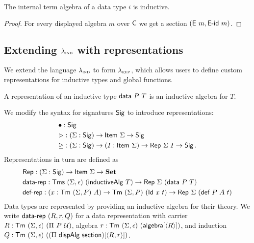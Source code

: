 \begin{lemma}
	The internal term algebra of a data type $i$ is inductive.
	\begin{proof}
		For every displayed algebra $m$ over $\textsf{C}$ we get a section $(\textsf{E}\ m, \textsf{E-id}\ m)$.
	\end{proof}
\end{lemma}


\subsection{Extending $\lambda_{\textsc{ind}}$ with representations}

We extend the language $\lambda_{\textsc{ind}}$ to form $\lambda_{\textsc{rep}}$, which allows users to
define custom representations for inductive types and global functions.

\begin{definition}
	A representation of an inductive type $\textsf{data}\ P\ T$ is an inductive algebra for $T$.
\end{definition}

We modify the syntax for signatures $\textsf{Sig}$ to introduce representations:
\begin{align*}
	 & \bullet : \Sig \\
	 & \rhd : (\Sigma : \Sig) \to \Item\ \Sigma \to \Sig \\
	 & \unrhd : (\Sigma : \Sig) \to (I : \Item\ \Sigma) \to \Rep\ \Sigma\ I \to \Sig \,.
\end{align*}
Representations in turn are defined as
\begin{align*}
& \Rep : (\Sigma : \Sig) \to \Item\ \Sigma \to \Set \\
& \mta{data-rep} : \Tms\ (\Sigma, \epsilon)\ (\mta{inductiveAlg}\ T) \to \Rep\ \Sigma\ (\mta{data}\ P\ T) \\
& \mta{def-rep} : (x : \Tm\ (\Sigma, P)\ A) \to \Tm\ (\Sigma, P)\ (\mta{Id}\ x\ t) \to \Rep\ \Sigma\ (\mta{def}\ P\ A\ t)
\end{align*}
Data types are represented by providing an inductive algebra for their theory.
We write $\textsf{data-rep}\ (R, r, Q)$ for a data representation with carrier $R :
\textsf{Tm}\ (\Sigma, \epsilon)\ (\Pi\ P\ \mathcal{U})$, algebra $r : \textsf{Tm}\ (\Sigma, \epsilon)\ (\textsf{algebra}[\langle R\rangle])$,
and induction $Q : \textsf{Tm}\ (\Sigma, \epsilon)\ ((\Pi\ \textsf{dispAlg}\ \textsf{section})[\langle R, r\rangle])$.

